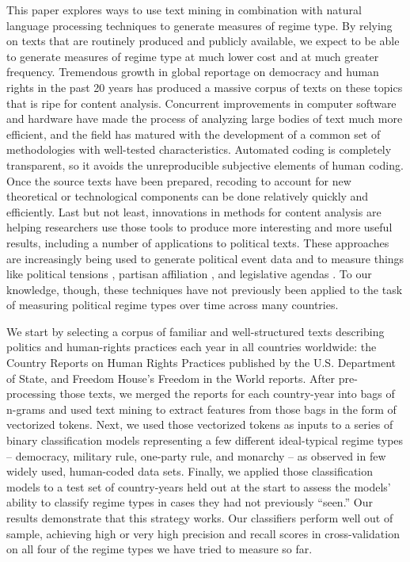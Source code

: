\documentclass[pdftex,12pt,fullpage,oneside]{amsart}
\begin{document}
This paper explores ways to use text mining in combination with natural language processing techniques to generate measures of regime type. By relying on texts that are routinely produced and publicly available, we expect to be able to generate measures of regime type at much lower cost and at much greater frequency. Tremendous growth in global reportage on democracy and human rights in the past 20 years has produced a massive corpus of texts on these topics that is ripe for content analysis. Concurrent improvements in computer software and hardware have made the process of analyzing large bodies of text much more efficient, and the field has matured with the development of a common set of methodologies with well-tested characteristics. Automated coding is completely transparent, so it avoids the unreproducible subjective elements of human coding. Once the source texts have been prepared, recoding to account for new theoretical or technological components can be done relatively quickly and efficiently. Last but not least, innovations in methods for content analysis are helping researchers use those tools to produce more interesting and more useful results, including a number of applications to political texts. These approaches are increasingly being used to generate political event data \cite{dorazio:etal:2014,king:lowe:2003,oconnor:etal:2013} and to measure things like political tensions \cite{chadefaux:2014}, partisan affiliation \citep{slapin:proksch:2010,yu:etal:2008}, and legislative agendas \citep{grimmer:2010}. To our knowledge, though, these techniques have not previously been applied to the task of measuring political regime types over time across many countries.

We start by selecting a corpus of familiar and well-structured texts describing politics and human-rights practices each year in all countries worldwide: the Country Reports on Human Rights Practices published by the U.S. Department of State, and Freedom House's Freedom in the World reports. After pre-processing those texts, we merged the reports for each country-year into bags of n-grams and used text mining to extract features from those bags in the form of vectorized tokens. Next, we used those vectorized tokens as inputs to a series of binary classification models representing a few different ideal-typical regime types -- democracy, military rule, one-party rule, and monarchy -- as observed in few widely used, human-coded data sets. Finally, we applied those classification models to a test set of country-years held out at the start to assess the models' ability to classify regime types in cases they had not previously ``seen.'' Our results demonstrate that this strategy works. Our classifiers perform well out of sample, achieving high or very high precision and recall scores in cross-validation on all four of the regime types we have tried to measure so far. 
\end{document}
